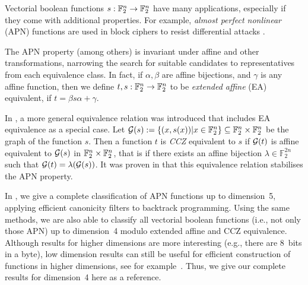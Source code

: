 Vectorial boolean functions $s: {\mathbb{F}}_2^n\to{\mathbb{F}}_2^n$ have many applications, especially if they come with additional properties. For example, \emph{almost perfect nonlinear} (APN) functions are used in block ciphers to resist differential attacks \cite{Nyberg1993}.

The APN property (among others) is invariant under affine and other transformations, narrowing the search for suitable candidates to representatives from each equivalence class. In fact, if $\alpha, \beta$ are affine bijections, and $\gamma$ is any affine function, then we define $t, s: {\mathbb{F}}_2^n\to{\mathbb{F}}_2^n$ to be \emph{extended affine} (EA) equivalent, if $t = \beta s \alpha + \gamma$.

In \cite{Carlet1998}, a more general equivalence relation was introduced that includes EA equivalence as a special case. Let $\mathcal{G}(s) := \{(x,s(x)) | x \in{\mathbb{F}}_2^n\} \subseteq {\mathbb{F}}_2^n\times{\mathbb{F}}_2^n$ be the graph of the function
$s$. Then a function $t$ is \emph{CCZ} equivalent to $s$ if $\mathcal{G}(t)$ is affine equivalent to $\mathcal{G}(s)$ in ${\mathbb{F}}_2^n\times{\mathbb{F}}_2^n$, that is if there exists an affine bijection $\lambda\in {\mathbb F}_2^{2n}$ such that $\mathcal{G}(t) = \lambda(\mathcal{G}(s))$. It was proven in \cite{Carlet1998} that this equivalence relation stabilises the APN property.

In \cite{Brinkmann2008}, we give a complete classification of APN functions up to dimension~5, applying efficient canonicity filters to backtrack programming.  Using the same methods, we are also able to classify all vectorial boolean functions (i.e., not only those APN) up to dimension~4 modulo extended affine and CCZ equivalence. Although results for higher dimensions are more interesting (e.g., there are 8~bits in a byte), low dimension results can still be useful for efficient construction of functions in higher dimensions, see for example~\cite{Boss2017}. Thus, we give our complete results for dimension~4 here as a reference.
